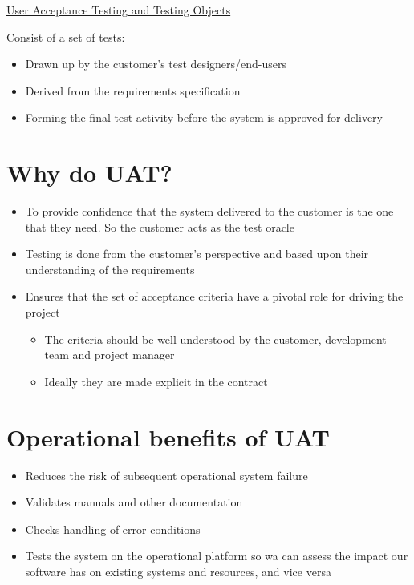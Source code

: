 \documentclass{article}[18pt]
\begin{document}
\begin{center}
\underline{\huge User Acceptance Testing and Testing Objects}
\end{center}
Consist of a set of tests:
\begin{itemize}
	\item Drawn up by the customer's test designers/end-users
	\item Derived from the requirements specification
	\item Forming the final test activity before the system is approved for delivery
\end{itemize}
\section{Why do UAT?}
\begin{itemize}
	\item To provide confidence that the system delivered to the customer is the one that they need. So the customer acts as the test oracle
	\item Testing is done from the customer's perspective and based upon their understanding of the requirements
	\item Ensures that the set of acceptance criteria have a pivotal role for driving the project
	\begin{itemize}
		\item The criteria should be well understood by the customer, development team and project manager
		\item Ideally they are made explicit in the contract
	\end{itemize}
\end{itemize}
\section{Operational benefits of UAT}
\begin{itemize}
	\item Reduces the risk of subsequent operational system failure
	\item Validates manuals and other documentation
	\item Checks handling of error conditions
	\item Tests the system on the operational platform so wa can assess the impact our software has on existing systems and resources, and vice versa
\end{itemize}
\end{document}
